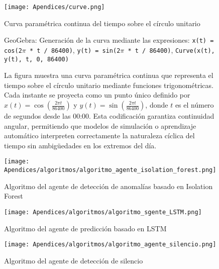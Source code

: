 \begin{figure}[ht!]
  \centering
  \texttt{[image: Apendices/curve.png]}
  \caption{Curva paramétrica continua del tiempo sobre el círculo unitario}
  \caption*{GeoGebra: Generación de la curva mediante las expresiones: \newline
    \texttt{x(t) = cos(2$\pi$ * t / 86400)}, \quad
    \texttt{y(t) = sin(2$\pi$ * t / 86400)}, \quad
    \texttt{Curve(x(t), y(t), t, 0, 86400)}}
  \caption*{La figura muestra una curva paramétrica continua que representa el tiempo sobre el círculo unitario mediante funciones trigonométricas. Cada instante se proyecta como un punto único definido por \( x(t) = \cos\left(\frac{2\pi t}{86400}\right) \) y \( y(t) = \sin\left(\frac{2\pi t}{86400}\right) \), donde \( t \) es el número de segundos desde las 00:00. Esta codificación garantiza continuidad angular, permitiendo que modelos de simulación o aprendizaje automático interpreten correctamente la naturaleza cíclica del tiempo sin ambigüedades en los extremos del día.}
  \label{fig:curva-tiempo-circular}
\end{figure}


\begin{figure}[ht!]
  \centering
  \texttt{[image: Apendices/algoritmos/algoritmo\_agente\_isolation\_forest.png]}
  \caption{Algoritmo del agente de detección de anomalías basado en Isolation Forest}
  \label{fig:algoritmo_agente_isolation_forest}
\end{figure}

\begin{figure}[ht!]
  \centering
  \texttt{[image: Apendices/algoritmos/algoritmo\_sgente\_LSTM.png]}
  \caption{Algoritmo del agente de predicción basado en LSTM}
  \label{fig:algoritmo_agente_LSTM}
\end{figure}

\begin{figure}[ht!]
  \centering
  \texttt{[image: Apendices/algoritmos/algoritmo\_agente\_silencio.png]}
  \caption{Algoritmo del agente de detección de silencio}
  \label{fig:algoritmo_agente_silencio}
\end{figure}


